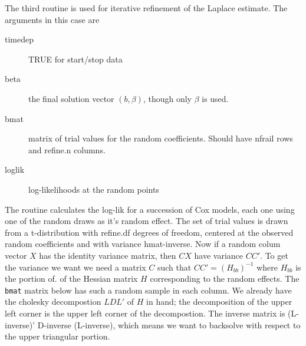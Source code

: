 \documentclass{article}
\begin{document}
The third routine is used for iterative refinement of the Laplace
estimate. The arguments in this case are
\begin{description}
  \item[timedep] TRUE for start/stop data
  \item[beta] the final solution vector $(b, \beta)$, though only $\beta$
    is used.
  \item[bmat] matrix of trial values for the random coefficients.
    Should have nfrail rows and refine.n columns.
  \item[loglik] log-likelihoods at the random points
\end{description}

The routine calculates the log-lik for a succession of Cox models, each
one using one of the random draws as it's random effect.       %
The set of trial values is drawn from a t-distribution with
refine.df degrees of freedom, centered at the observed
random coefficients and with variance hmat-inverse.
Now if a random colum vector $X$ has the identity variance
matrix, then $CX$ have variance $CC'$.    %
To get the variance we want we need a matrix
$C$ such that 
$CC' = (H_{bb})^{-1}$  where $H_{bb}$ is the portion of.%
of the Hessian matrix $H$ corresponding to the random effects.
The \Verb!bmat! matrix below has such a random sample in each column.
We already have the cholesky decompostion $LDL'$ of $H$ in hand; %
the decomposition of the upper left corner is the upper left
corner of the decompostion.
The inverse matrix is (L-inverse)' D-inverse (L-inverse), which %
means we want to backsolve with respect to the upper triangular
portion. 
\end{document}
